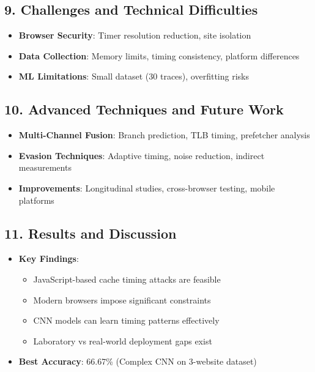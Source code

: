 \documentclass[11pt,a4paper]{article}
\begin{document}
\subsection{9. Challenges and Technical Difficulties}
\begin{itemize}[leftmargin=*]
    \item \textbf{Browser Security}: Timer resolution reduction, site isolation
    \item \textbf{Data Collection}: Memory limits, timing consistency, platform differences
    \item \textbf{ML Limitations}: Small dataset (30 traces), overfitting risks
\end{itemize}

\subsection{10. Advanced Techniques and Future Work}
\begin{itemize}[leftmargin=*]
    \item \textbf{Multi-Channel Fusion}: Branch prediction, TLB timing, prefetcher analysis
    \item \textbf{Evasion Techniques}: Adaptive timing, noise reduction, indirect measurements
    \item \textbf{Improvements}: Longitudinal studies, cross-browser testing, mobile platforms
\end{itemize}

\subsection{11. Results and Discussion}
\begin{itemize}[leftmargin=*]
    \item \textbf{Key Findings}:
    \begin{itemize}
        \item JavaScript-based cache timing attacks are feasible
        \item Modern browsers impose significant constraints
        \item CNN models can learn timing patterns effectively
        \item Laboratory vs real-world deployment gaps exist
    \end{itemize}
    \item \textbf{Best Accuracy}: 66.67\% (Complex CNN on 3-website dataset)
\end{itemize}
\end{document}
